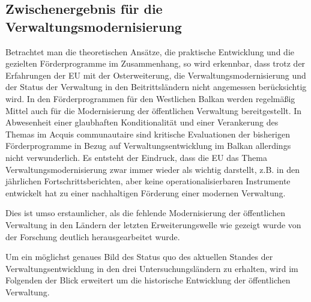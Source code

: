 \subsection{Zwischenergebnis für die Verwaltungsmodernisierung}
Betrachtet man die theoretischen Ansätze, die praktische Entwicklung und die gezielten Förderprogramme im Zusammenhang, so wird erkennbar, dass trotz der Erfahrungen der EU mit der Osterweiterung, die Verwaltungsmodernisierung und der Status der Verwaltung in den Beitrittsländern nicht angemessen berücksichtig wird. In den Förderprogrammen für den Westlichen Balkan werden regelmäßig Mittel auch für die Modernisierung der öffentlichen Verwaltung bereitgestellt. In Abwesenheit einer glaubhaften Konditionalität und einer Verankerung des Themas im Acquis communautaire sind kritische Evaluationen der bisherigen Förderprogramme in Bezug auf Verwaltungsentwicklung im Balkan allerdings nicht verwunderlich. Es entsteht der Eindruck, dass die EU das Thema Verwaltungsmodernisierung zwar immer wieder als wichtig darstellt, z.B. in den jährlichen Fortschrittsberichten, aber keine operationalisierbaren Instrumente entwickelt hat zu einer nachhaltigen Förderung einer modernen Verwaltung. \par
Dies ist umso erstaunlicher, als die fehlende Modernisierung der öffentlichen Verwaltung in den Ländern der letzten Erweiterungswelle wie gezeigt wurde von der Forschung deutlich herausgearbeitet wurde.\par
Um ein möglichst genaues Bild des Status quo des aktuellen Standes der Verwaltungsentwicklung in den drei Untersuchungsländern zu erhalten, wird im Folgenden der Blick erweitert um die historische Entwicklung der öffentlichen Verwaltung.



